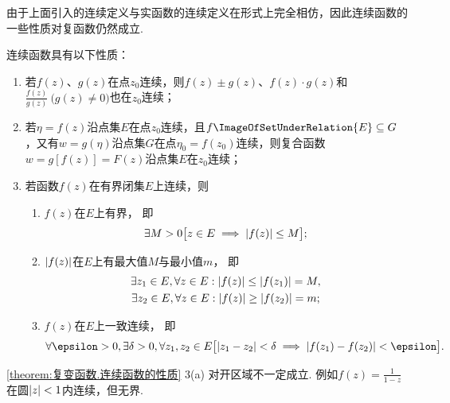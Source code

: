 由于上面引入的连续定义与实函数的连续定义在形式上完全相仿，因此连续函数的一些性质对复函数仍然成立.
\begin{property}\label{theorem:复变函数.连续函数的性质}
连续函数具有以下性质：
\begin{enumerate}
\item 若\(f(z)\)、\(g(z)\)在点\(z_0\)连续，则\(f(z) \pm g(z)\)、\(f(z) \cdot g(z)\)和\(\frac{f(z)}{g(z)}\ \bigl(g(z) \neq 0\bigr)\)也在\(z_0\)连续；

\item 若\(\eta = f(z)\)沿点集\(E\)在点\(z_0\)连续，且\(f\ImageOfSetUnderRelation{E} \subseteq G\)，又有\(w=g(\eta)\)沿点集\(G\)在点\(\eta_0=f(z_0)\)连续，则复合函数\(w=g[f(z)]=F(z)\)沿点集\(E\)在\(z_0\)连续；

\item 若函数\(f(z)\)在有界闭集\(E\)上连续，则\begin{enumerate}
\item\label{theorem:复变函数.连续函数的性质.3a}
\(f(z)\)在\(E\)上有界，
即\begin{equation*}
\exists M>0 \bigl[
z \in E \implies \abs{f(z)} \leq M
\bigr];
\end{equation*}

\item\label{theorem:复变函数.连续函数的性质.3b}
\(\abs{f(z)}\)在\(E\)上有最大值\(M\)与最小值\(m\)，
即\begin{gather*}
\exists z_1 \in E, \forall z \in E : \abs{f(z)} \leq \abs{f(z_1)} = M, \\
\exists z_2 \in E, \forall z \in E : \abs{f(z)} \geq \abs{f(z_2)} = m;
\end{gather*}

\item\label{theorem:复变函数.连续函数的性质.3c}
\(f(z)\)在\(E\)上一致连续，
即\begin{equation*}
\forall \epsilon>0, \exists \delta>0, \forall z_1,z_2 \in E \bigl[
\abs{z_1-z_2}<\delta
\implies
\abs{f(z_1)-f(z_2)}<\epsilon
\bigr].
\end{equation*}
\end{enumerate}
\end{enumerate}
\end{property}
\cref{theorem:复变函数.连续函数的性质}  3(a) 对开区域不一定成立.
例如\(f(z) = \frac{1}{1-z}\)在圆\(\abs{z} < 1\)内连续，但无界.

